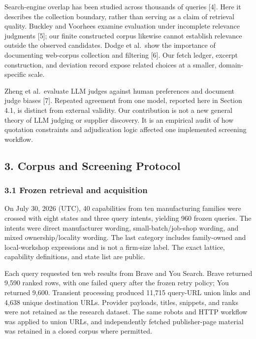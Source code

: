 \documentclass[10pt]{article}
\begin{document}
Search-engine overlap has been studied across thousands of queries {[}4{]}. Here it describes the collection boundary, rather than serving as a claim of retrieval quality. Buckley and Voorhees examine evaluation under incomplete relevance judgments {[}5{]}; our finite constructed corpus likewise cannot establish relevance outside the observed candidates. Dodge et al.~show the importance of documenting web-corpus collection and filtering {[}6{]}. Our fetch ledger, excerpt construction, and deviation record expose related choices at a smaller, domain-specific scale.

Zheng et al.~evaluate LLM judges against human preferences and document judge biases {[}7{]}. Repeated agreement from one model, reported here in Section 4.1, is distinct from external validity. Our contribution is not a new general theory of LLM judging or supplier discovery. It is an empirical audit of how quotation constraints and adjudication logic affected one implemented screening workflow.

\hypertarget{corpus-and-screening-protocol}{%
\subsection{3. Corpus and Screening Protocol}\label{corpus-and-screening-protocol}}

\hypertarget{frozen-retrieval-and-acquisition}{%
\subsubsection{3.1 Frozen retrieval and acquisition}\label{frozen-retrieval-and-acquisition}}

On July 30, 2026 (UTC), 40 capabilities from ten manufacturing families were crossed with eight states and three query intents, yielding 960 frozen queries. The intents were direct manufacturer wording, small-batch/job-shop wording, and mixed ownership/locality wording. The last category includes family-owned and local-workshop expressions and is not a firm-size label. The exact lattice, capability definitions, and state list are public.

Each query requested ten web results from Brave and You Search. Brave returned 9,590 ranked rows, with one failed query after the frozen retry policy; You returned 9,600. Transient processing produced 11,715 query-URL union links and 4,638 unique destination URLs. Provider payloads, titles, snippets, and ranks were not retained as the research dataset. The same robots and HTTP workflow was applied to union URLs, and independently fetched publisher-page material was retained in a closed corpus where permitted.
\end{document}

